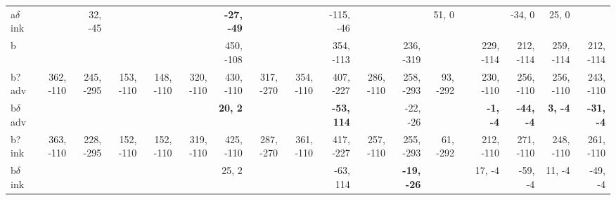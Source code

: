 \begin{table}[p]
{\begin{tabular}{lrrrrrrrrrrrrrrrrr}
a$\delta$ ink &  & 32, -45 &  &  &  & \textbf{-27, -49} &  &  & -115, -46 &  &  & 51, 0 &  &  & -34, 0 & 25, 0 &  \\
b &  &  &  &  &  & 450, -108 &  &  & 354, -113 &  & 236, -319 &  &  & 229, -114 & 212, -114 & 259, -114 & 212, -114 \\
b? adv & 362, -110 & 245, -295 & 153, -110 & 148, -110 & 320, -110 & 430, -110 & 317, -270 & 354, -110 & 407, -227 & 286, -110 & 258, -293 & 93, -292 &  & 230, -110 & 256, -110 & 256, -110 & 243, -110 \\
b$\delta$ adv &  &  &  &  &  & \textbf{20, 2} &  &  & \textbf{-53, 114} &  & -22, -26 &  &  & \textbf{-1, -4} & \textbf{-44, -4} & \textbf{3, -4} & \textbf{-31, -4} \\
b? ink & 363, -110 & 228, -295 & 152, -110 & 152, -110 & 319, -110 & 425, -110 & 287, -270 & 361, -110 & 417, -227 & 257, -110 & 255, -293 & 61, -292 &  & 212, -110 & 271, -110 & 248, -110 & 261, -110 \\
b$\delta$ ink &  &  &  &  &  & 25, 2 &  &  & -63, 114 &  & \textbf{-19, -26} &  &  & 17, -4 & -59, -4 & 11, -4 & -49, -4 \\

\end{tabular}
}
\end{table}
\clearpage


